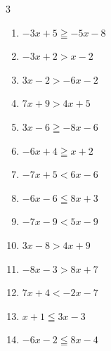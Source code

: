 \begin{multicols}{3}
\begin{enumerate}
        \phantom{$\displaystyle x>-1$}

  \item $-3x+5\geqq -5x-8$


  \item $-3x+2>x-2$

        \phantom{$\displaystyle x<1$}

  \item $3x-2>-6x-2$

        \phantom{$\displaystyle x>0$}

  \item $7x+9>4x+5$


  \item $3x-6\geqq -8x-6$

        \phantom{$\displaystyle x\geqq 0$}

  \item $-6x+4\geqq x+2$


  \item $-7x+5<6x-6$


  \item $-6x-6\leqq 8x+3$


  \item $-7x-9<5x-9$

        \phantom{$\displaystyle x>0$}

  \item $3x-8>4x+9$

        \phantom{$\displaystyle x<-17$}

  \item $-8x-3>8x+7$


  \item $7x+4<-2x-7$


  \item $x+1\leqq 3x-3$

        \phantom{$\displaystyle x\geqq 2$}

  \item $-6x-2\leqq 8x-4$


\end{enumerate}
\end{multicols}
